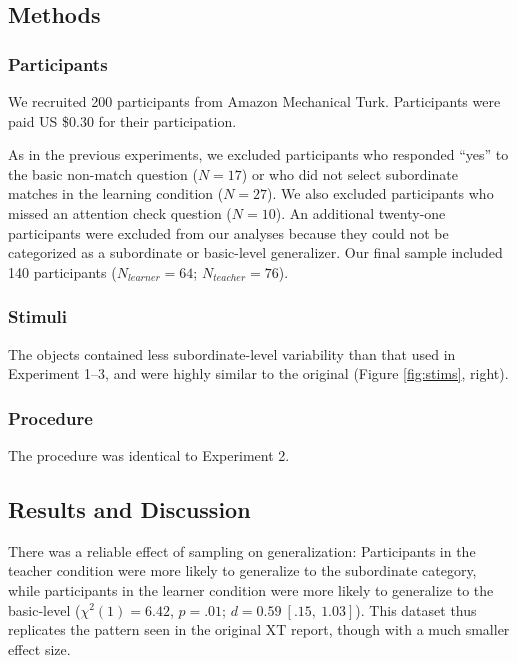 \documentclass[man]{apa2}
\begin{document}
\subsection{Methods}

\subsubsection{Participants}  

We recruited 200 participants from Amazon Mechanical Turk. Participants were paid US \$0.30 for their participation.

As in the previous experiments, we excluded participants who responded ``yes'' to the basic non-match question ($N=17$) or who did not select subordinate matches in the learning condition ($N = 27$). We also excluded participants who missed an attention check question ($N = 10$). An additional twenty-one participants were excluded from our analyses because they could not be categorized as a subordinate or basic-level generalizer.  Our final sample included 140 participants ($N_{learner} = 64$; $N_{teacher} = 76$). 

\subsubsection{Stimuli}

The objects contained less subordinate-level variability than that used in Experiment 1--3, and were highly similar to the original (Figure \ref{fig:stims}, right).

\subsubsection{Procedure}

The procedure was identical to Experiment 2.

\subsection{Results and Discussion}


There was a reliable effect of sampling on generalization: Participants in the teacher condition were more likely to generalize to the subordinate category, while participants in the learner condition were more likely to generalize to the basic-level ($\chi^2(1) = 6.42$, $p = .01$; $d = 0.59\ [.15,\ 1.03]$). This dataset thus replicates the pattern seen in the original XT report, though with a much smaller effect size.
\end{document}
